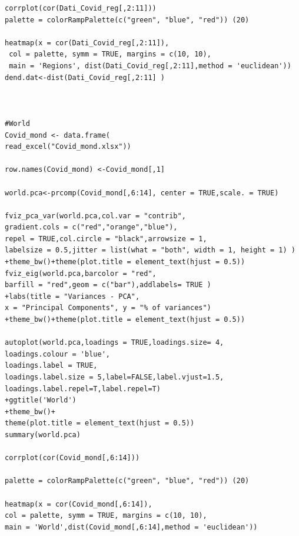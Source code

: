 \documentclass[
12pt, %
a4paper, %
oneside, %
headinclude,footinclude, %
BCOR5mm, %
]{scrartcl}
\begin{document}
\begin{lstlisting}
corrplot(cor(Dati_Covid_reg[,2:11]))
palette = colorRampPalette(c("green", "blue", "red")) (20)

heatmap(x = cor(Dati_Covid_reg[,2:11]),
 col = palette, symm = TRUE, margins = c(10, 10),
 main = 'Regions', dist(Dati_Covid_reg[,2:11],method = 'euclidean'))
dend.dat<-dist(Dati_Covid_reg[,2:11] )



#World
Covid_mond <- data.frame(
read_excel("Covid_mond.xlsx"))

row.names(Covid_mond) <-Covid_mond[,1]

world.pca<-prcomp(Covid_mond[,6:14], center = TRUE,scale. = TRUE)

fviz_pca_var(world.pca,col.var = "contrib",
gradient.cols = c("red","orange","blue"),
repel = TRUE,col.circle = "black",arrowsize = 1,
labelsize = 0.5,jitter = list(what = "both", width = 1, height = 1) ) 
+theme_bw()+theme(plot.title = element_text(hjust = 0.5)) 
fviz_eig(world.pca,barcolor = "red",
barfill = "red",geom = c("bar"),addlabels= TRUE )
+labs(title = "Variances - PCA",
x = "Principal Components", y = "% of variances")
+theme_bw()+theme(plot.title = element_text(hjust = 0.5))

autoplot(world.pca,loadings = TRUE,loadings.size= 4,
loadings.colour = 'blue',
loadings.label = TRUE,
loadings.label.size = 5,label=FALSE,label.vjust=1.5,
loadings.label.repel=T,label.repel=T)
+ggtitle('World')
+theme_bw()+
theme(plot.title = element_text(hjust = 0.5)) 
summary(world.pca)

corrplot(cor(Covid_mond[,6:14]))

palette = colorRampPalette(c("green", "blue", "red")) (20)

heatmap(x = cor(Covid_mond[,6:14]), 
col = palette, symm = TRUE, margins = c(10, 10),
main = 'World',dist(Covid_mond[,6:14],method = 'euclidean'))

\end{lstlisting}




\renewcommand{\refname}{\spacedlowsmallcaps{References}} %




\end{document}
